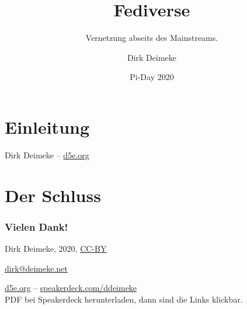 \documentclass[t,aspectratio=169]{beamer}
\title{Fediverse}
\subtitle{Vernetzung abseits des Mainstreams.}
\author{Dirk Deimeke}
\institute{My own IT @ Chemnitzer Linux-Tage}
\date{Pi-Day 2020}
\begin{document}
\begin{frame}
	\titlepage
\end{frame}

\section{Einleitung}

\begin{frame}[standout]
    Dirk Deimeke -- \href{https://d5e.org/}{d5e.org}
\end{frame}

\section{Der Schluss}

\begin{frame}[fragile]\frametitle{Vielen Dank!}
    \vfill
    \begin{center}
        Dirk Deimeke, 2020, \href{https://creativecommons.org/licenses/by/4.0/}{CC-BY}

        \href{mailto:dirk@deimeke.net}{dirk@deimeke.net}

        \href{https://d5e.org/}{d5e.org} -- \href{https://speakerdeck.com/ddeimeke/}{speakerdeck.com/ddeimeke} \\
        {\tiny PDF bei Speakerdeck herunterladen, dann sind die Links klickbar.}
    \end{center}
\end{frame}
\end{document}
